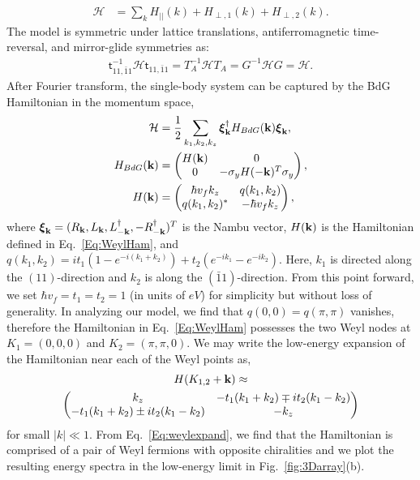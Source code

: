\begin{align}\mathcal{H}&=\sum_{k}H_{||}(k)+H_{\perp,1}(k)+H_{\perp,2}(k).\label{Eq:WeylHam}\end{align} The model is symmetric under lattice translations, antiferromagnetic time-reversal, and mirror-glide symmetries as: \begin{align}\mathsf{t}_{11,\bar{1}1}^{-1}\mathcal{H}\mathsf{t}_{11,\bar{1}1}=T_A^{-1}\mathcal{H}T_A=G^{-1}\mathcal{H}G=\mathcal{H}.\end{align} After Fourier transform, the single-body system can be captured by the BdG Hamiltonian in the momentum space, \begin{align}\mathcal{H}&=\frac{1}{2}\sum_{k_1,k_2,k_z}\boldsymbol\xi_{\bf k}^\dagger H_{BdG}({\bf k})\boldsymbol\xi_{\bf k},\nonumber\\
H_{BdG}({\bf k})&=\begin{pmatrix}H({\bf k})&0\\0&-\sigma_yH(-{\bf k})^T\sigma_y\end{pmatrix},\label{Eq:BdG}\\
H({\bf k})&=\begin{pmatrix}
\hbar v_fk_z & q(k_1,k_2) \\
q(k_1,k_2)^\ast & -\hbar v_fk_z \\
\end{pmatrix},\nonumber
\end{align}
where $\boldsymbol\xi_{\bf k}=(R_{\bf k},L_{\bf k},L_{-{\bf k}}^\dagger,-R_{-{\bf k}}^\dagger)^T$ is the Nambu vector, $H({\bf k})$ is the Hamiltonian defined in Eq.~\eqref{Eq:WeylHam}, and $q(k_1,k_2)=it_1(1-e^{-i(k_1+k_2)})+t_2(e^{-ik_1}-e^{-ik_2})$. Here, $k_1$ is directed along the $(11)$-direction and $k_2$ is along the $(\bar{1}1)$-direction. From this point forward, we set $\hbar v_f=t_1=t_2=1$ (in units of $eV$) for simplicity but without loss of generality. In analyzing our model, we find that $q(0,0)=q(\pi,\pi)$ vanishes, therefore the Hamiltonian in Eq.~\eqref{Eq:WeylHam} possesses the two Weyl nodes at $K_1=(0,0,0)$ and $K_2=(\pi,\pi,0)$. We may write the low-energy expansion of the Hamiltonian near each of the Weyl points as,
\begin{gather}
H(K_{1,2}+{\bf k})\approx \nonumber
\\ \left(\begin{matrix}
k_z & -t_1(k_1+k_2) \mp it_2(k_1-k_2) \\
-t_1(k_1+k_2) \pm it_2(k_1-k_2) & -k_z \\
\end{matrix}\right)\label{Eq:weylexpand}
\end{gather}
for small $|k| \ll 1$. From Eq.~\eqref{Eq:weylexpand}, we find that the Hamiltonian is comprised of a pair of Weyl fermions with opposite chiralities and we plot the resulting energy spectra in the low-energy limit in Fig.~\ref{fig:3Darray}(b).


